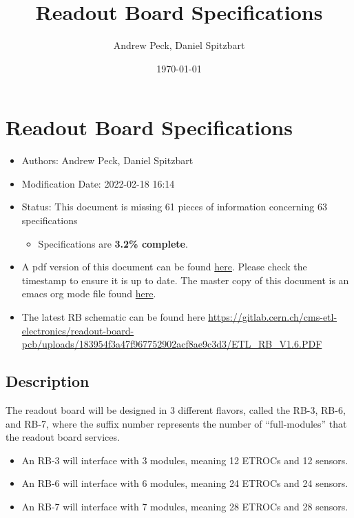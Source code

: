 \documentclass[11pt]{article}
\author{Andrew Peck, Daniel Spitzbart}
\date{\today}
\title{Readout Board Specifications}
\begin{document}
\maketitle

\section{Readout Board Specifications}
\label{sec:orge6a688f}

\begin{itemize}
\item Authors: Andrew Peck, Daniel Spitzbart

\item Modification Date: 2022-02-18 16:14

\item Status: This document is missing 61 pieces of information concerning  63 specifications
\begin{itemize}
\item Specifications are \textbf{3.2\% complete}.
\end{itemize}

\item A pdf version of this document can be found \href{./rb-specs.pdf}{here}. Please check the timestamp to ensure it is up to date. The master copy of this document is an emacs org mode file found \href{https://gitlab.cern.ch/cms-etl-electronics/readout-board-docs/-/blob/master/docs/Specifications/rb-specs.org}{here}.

\item The latest RB schematic can be found here \url{https://gitlab.cern.ch/cms-etl-electronics/readout-board-pcb/uploads/183954f3a47f967752902acf8ae9c3d3/ETL\_RB\_V1.6.PDF}
\end{itemize}

\setcounter{tocdepth}{3}
\tableofcontents

\subsection{Description}
\label{sec:org998aeb1}

The readout board will be designed in 3 different flavors, called the RB-3, RB-6, and RB-7, where the suffix number represents the number of ``full-modules'' that the readout board services.

\begin{itemize}
\item An RB-3 will interface with 3 modules, meaning 12 ETROCs and 12 sensors.
\item An RB-6 will interface with 6 modules, meaning 24 ETROCs and 24 sensors.
\item An RB-7 will interface with 7 modules, meaning 28 ETROCs and 28 sensors.
\end{itemize}
\end{document}
